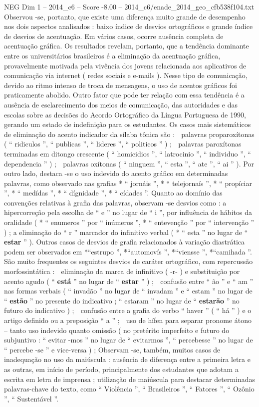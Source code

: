 \begin{textsample}{NEG Dim 1 – 2014\_c6 – Score -8.00 – 2014\_c6/enade\_2014\_geo\_cfb538f104.txt}
Observou -se, portanto, que existe uma diferença muito grande de desempenho nos dois aspectos analisados : baixo índice de desvios ortográficos e grande índice de desvios de acentuação.
Em vários casos, ocorre ausência completa de acentuação gráfica.
Os resultados revelam, portanto, que a tendência dominante entre os universitários brasileiros é a eliminação da acentuação gráfica, provavelmente motivada pela vivência dos jovens relacionada aos aplicativos de comunicação via internet ( redes sociais e e-mails ).
Nesse tipo de comunicação, devido ao ritmo intenso de troca de mensagens, o uso de acentos gráficos foi praticamente abolido.
Outro fator que pode ter relação com essa tendência é a ausência de esclarecimento dos meios de comunicação, das autoridades e das escolas sobre as decisões do Acordo Ortográfico da Língua Portuguesa de 1990, gerando um estado de indefinição para os estudantes.
Os casos mais sistemáticos de eliminação do acento indicador da sílaba tônica são :  palavras proparoxítonas ( “ ridiculos ”, “ publicas ”, “ lideres ”, “ politicos ” ) ;  palavras paroxítonas terminadas em ditongo crescente ( “ homicidios ”, “ latrocinio ”, “ individuo ”, “ dependencia ” ) ;  palavras oxítonas ( “ ninguem ”, “ esta ”, “ ate ”, “ ai ” ).
Por outro lado, destaca -se o uso indevido do acento gráfico em determinadas palavras, como observado nas grafias * “ jornáis ”, * “ telejornaís ”, * “ propíciar ”, * “ medídas ”, * “ dígnidade ”, * “ cídades ”.
Quanto ao domínio das convenções relativas à grafia das palavras, observam -se desvios como : a hipercorreção pela escolha de “ e ” no lugar de “ i ”, por influência de hábitos da oralidade ( * “ enumeros ” por “ inúmeros ”, * “ entevenção ” por “ intervenção ” ) ; a eliminação do “ r ” marcador do infinitivo verbal ( * “ esta ” no lugar de “ \textbf{estar} ” ).
Outros casos de desvios de grafia relacionados à variação diastrática podem ser observados em *“estrupo ”, *“automovís ”, *“viensse ”, *“camihada ”.
São muito frequentes os seguintes desvios de caráter ortográfico, com repercussão morfossintática :  eliminação da marca de infinitivo ( -r- ) e substituição por acento agudo ( “ \textbf{está} ” no lugar de “ \textbf{estar} ” ) ;  confusão entre “ ão ” e “ am ” nas formas verbais ( “ invadão ” no lugar de “ invadam ” e “ estam ” no lugar de “ \textbf{estão} ” no presente do indicativo ; “ estaram ” no lugar de “ \textbf{estarão} ” no futuro do indicativo ) ;  confusão entre a grafia do verbo “ haver ” ( “ há ” ) e o artigo definido ou a preposição “ a ” ;  uso de hífen para separar pronome átono – tanto uso indevido quanto omissão ( no pretérito imperfeito e futuro do subjuntivo : “ evitar -mos ” no lugar de “ evitarmos ”, “ percebesse ” no lugar de “ percebe -se ” e vice-versa ) ; Observam -se, também, muitos casos de inadequação no uso da maiúscula : ausência de diferença entre a primeira letra e as outras, em início de período, principalmente dos estudantes que adotam a escrita em letra de imprensa ; utilização de maiúscula para destacar determinadas palavras-chave do texto, como “ Violência ”, “ Brasileiros ”, “ Fatores ”, “ Ozônio ”, “ Sustentável ”.

\end{textsample}
